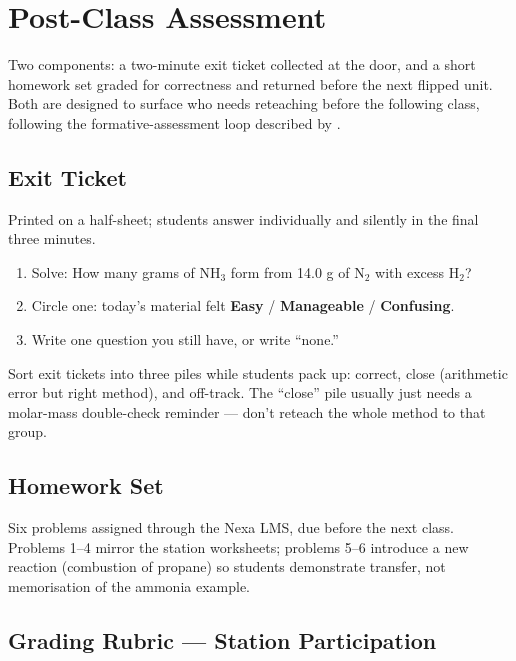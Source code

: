 \section{Post-Class Assessment}
\label{sec:assessment}

Two components: a two-minute exit ticket collected at the door, and a
short homework set graded for correctness and returned before the next
flipped unit. Both are designed to surface who needs reteaching before
the following class, following the formative-assessment loop described
by \citet{talbert2017flipped}.

\subsection*{Exit Ticket}

Printed on a half-sheet; students answer individually and silently in
the final three minutes.

\begin{enumerate}[label=\arabic*.]
  \item Solve: How many grams of $\mathrm{NH_3}$ form from 14.0 g of $\mathrm{N_2}$ with excess $\mathrm{H_2}$?
  \item Circle one: today's material felt \textbf{Easy} / \textbf{Manageable} / \textbf{Confusing}.
  \item Write one question you still have, or write ``none.''
\end{enumerate}

\begin{teachertip}
Sort exit tickets into three piles while students pack up: correct, close (arithmetic error but right method), and off-track. The ``close'' pile usually just needs a molar-mass double-check reminder --- don't reteach the whole method to that group.
\end{teachertip}

\subsection*{Homework Set}

Six problems assigned through the Nexa LMS, due before the next class.
Problems 1--4 mirror the station worksheets; problems 5--6 introduce a
new reaction (combustion of propane) so students demonstrate transfer,
not memorisation of the ammonia example.

\subsection*{Grading Rubric --- Station Participation}

